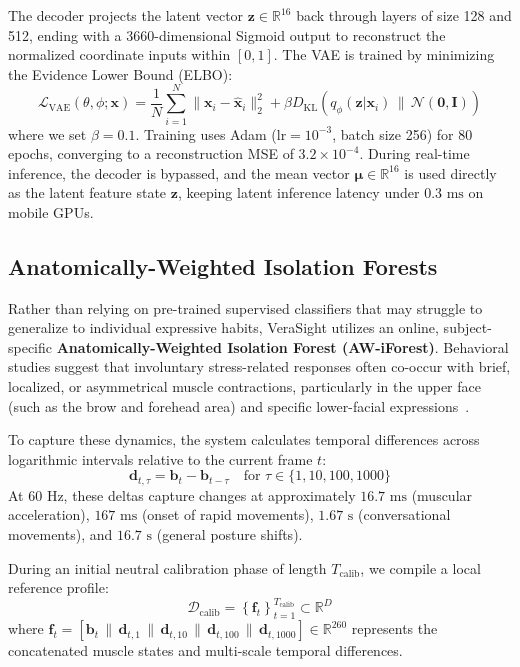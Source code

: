 \documentclass[sigconf]{acmart}
\begin{document}
The decoder projects the latent vector $\mathbf{z} \in \mathbb{R}^{16}$ back through layers of size 128 and 512, ending with a 3660-dimensional Sigmoid output to reconstruct the normalized coordinate inputs within $[0, 1]$. The VAE is trained by minimizing the Evidence Lower Bound (ELBO):
$$\mathcal{L}_{\text{VAE}}(\theta, \phi; \mathbf{x}) = \frac{1}{N} \sum_{i=1}^{N} \|\mathbf{x}_i - \hat{\mathbf{x}}_i\|^2_2 + \beta D_{\text{KL}}\left( q_\phi(\mathbf{z}|\mathbf{x}_i) \,\parallel\, \mathcal{N}(\mathbf{0}, \mathbf{I}) \right)$$
where we set $\beta = 0.1$. Training uses Adam ($\text{lr}=10^{-3}$, batch size 256) for 80 epochs, converging to a reconstruction MSE of $3.2 \times 10^{-4}$. During real-time inference, the decoder is bypassed, and the mean vector $\boldsymbol{\mu} \in \mathbb{R}^{16}$ is used directly as the latent feature state $\mathbf{z}$, keeping latent inference latency under $0.3\text{ ms}$ on mobile GPUs.

\subsection{Anatomically-Weighted Isolation Forests}
Rather than relying on pre-trained supervised classifiers that may struggle to generalize to individual expressive habits, VeraSight utilizes an online, subject-specific \textbf{Anatomically-Weighted Isolation Forest (AW-iForest)}. Behavioral studies suggest that involuntary stress-related responses often co-occur with brief, localized, or asymmetrical muscle contractions, particularly in the upper face (such as the brow and forehead area) and specific lower-facial expressions~\cite{porter2012secrets, vitale2021facial}.

To capture these dynamics, the system calculates temporal differences across logarithmic intervals relative to the current frame $t$:
$$\mathbf{d}_{t, \tau} = \mathbf{b}_t - \mathbf{b}_{t-\tau} \quad \text{for } \tau \in \{1, 10, 100, 1000\}$$
At 60 Hz, these deltas capture changes at approximately $16.7\text{ ms}$ (muscular acceleration), $167\text{ ms}$ (onset of rapid movements), $1.67\text{ s}$ (conversational movements), and $16.7\text{ s}$ (general posture shifts).

During an initial neutral calibration phase of length $T_{\text{calib}}$, we compile a local reference profile:
$$\mathcal{D}_{\text{calib}} = \left\{ \mathbf{f}_t \right\}_{t=1}^{T_{\text{calib}}} \subset \mathbb{R}^D$$
where $\mathbf{f}_t = [\mathbf{b}_t \,\|\, \mathbf{d}_{t, 1} \,\|\, \mathbf{d}_{t, 10} \,\|\, \mathbf{d}_{t, 100} \,\|\, \mathbf{d}_{t, 1000}] \in \mathbb{R}^{260}$ represents the concatenated muscle states and multi-scale temporal differences.
\end{document}
